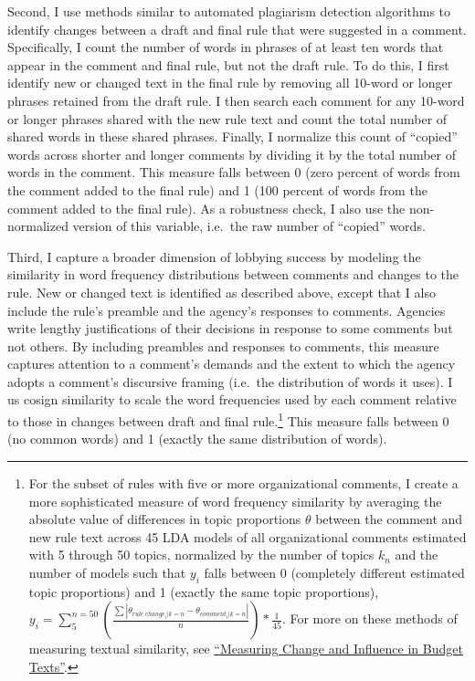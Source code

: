 \documentclass[
]{book}
\begin{document}
Second, I use methods similar to automated plagiarism detection algorithms to identify changes between a draft and final rule that were suggested in a comment. Specifically, I count the number of words in phrases of at least ten words that appear in the comment and final rule, but not the draft rule. To do this, I first identify new or changed text in the final rule by removing all 10-word or longer phrases retained from the draft rule. I then search each comment for any 10-word or longer phrases shared with the new rule text and count the total number of shared words in these shared phrases. Finally, I normalize this count of ``copied'' words across shorter and longer comments by dividing it by the total number of words in the comment. This measure falls between 0 (zero percent of words from the comment added to the final rule) and 1 (100 percent of words from the comment added to the final rule). As a robustness check, I also use the non-normalized version of this variable, i.e.~the raw number of ``copied'' words.

Third, I capture a broader dimension of lobbying success by modeling the similarity in word frequency distributions between comments and changes to the rule. New or changed text is identified as described above, except that I also include the rule's preamble and the agency's responses to comments. Agencies write lengthy justifications of their decisions in response to some comments but not others. By including preambles and responses to comments, this measure captures attention to a comment's demands and the extent to which the agency adopts a comment's discursive framing (i.e.~the distribution of words it uses). I us cosign similarity to scale the word frequencies used by each comment relative to those in changes between draft and final rule.\footnote{For the subset of rules with five or more organizational comments, I create a more sophisticated measure of word frequency similarity by averaging the absolute value of differences in topic proportions \(\theta\) between the comment and new rule text across 45 LDA models of all organizational comments estimated with 5 through 50 topics, normalized by the number of topics \(k_n\) and the number of models such that \(y_i\) falls between 0 (completely different estimated topic proportions) and 1 (exactly the same topic proportions), \(y_i = \sum_{5}^{n=50}(\frac{\sum|\theta_{rule\ change_i|k=n}-\theta_{comment_i|k=n}|}{n})*\frac{1}{45}\). For more on these methods of measuring textual similarity, see \href{https://judgelord.github.io/budgets/JudgeLordAPSA2017.pdf}{``Measuring Change and Influence in Budget Texts''}.} This measure falls between 0 (no common words) and 1 (exactly the same distribution of words).
\end{document}
